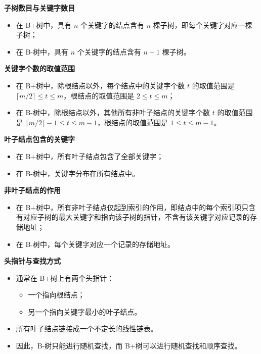 \documentclass[lang=cn,newtx,10pt,scheme=chinese]{../elegantbook}
\begin{document}
\textbf{子树数目与关键字数目}  

   \begin{itemize}
     \item 在 B+树中，具有 $n$ 个关键字的结点含有 $n$ 棵子树，即每个关键字对应一棵子树；
     \item 在 B-树中，具有 $n$ 个关键字的结点含有 $n+1$ 棵子树。
   \end{itemize}

\textbf{关键字个数的取值范围} 

   \begin{itemize}
     \item 在 B+树中，除根结点以外，每个结点中的关键字个数 $t$ 的取值范围是 $\lceil m/2 \rceil \leq t \leq m$，根结点的取值范围是 $2 \leq t \leq m$；
     \item 在 B-树中，除根结点以外，其他所有非叶子结点的关键字个数 $t$ 的取值范围是 $\lceil m/2 \rceil - 1 \leq t \leq m-1$，根结点的取值范围是 $1 \leq t \leq m-1$。
   \end{itemize}

\textbf{叶子结点包含的关键字}

   \begin{itemize}
     \item 在 B+树中，所有叶子结点包含了全部关键字；
     \item 在 B-树中，关键字分布在所有结点中。
   \end{itemize}

\textbf{非叶子结点的作用}  

   \begin{itemize}
     \item 在 B+树中，所有非叶子结点仅起到索引的作用，即结点中的每个索引项只含有对应子树的最大关键字和指向该子树的指针，不含有该关键字对应记录的存储地址；
     \item 在 B-树中，每个关键字对应一个记录的存储地址。
   \end{itemize}

   \textbf{头指针与查找方式}  

   \begin{itemize}
     \item 通常在 B+树上有两个头指针：
       \begin{itemize}
         \item 一个指向根结点；
         \item 另一个指向关键字最小的叶子结点。
       \end{itemize}
     \item 所有叶子结点链接成一个不定长的线性链表。
     \item 因此，B-树只能进行随机查找，而 B+树可以进行随机查找和顺序查找。
   \end{itemize}
\end{document}
